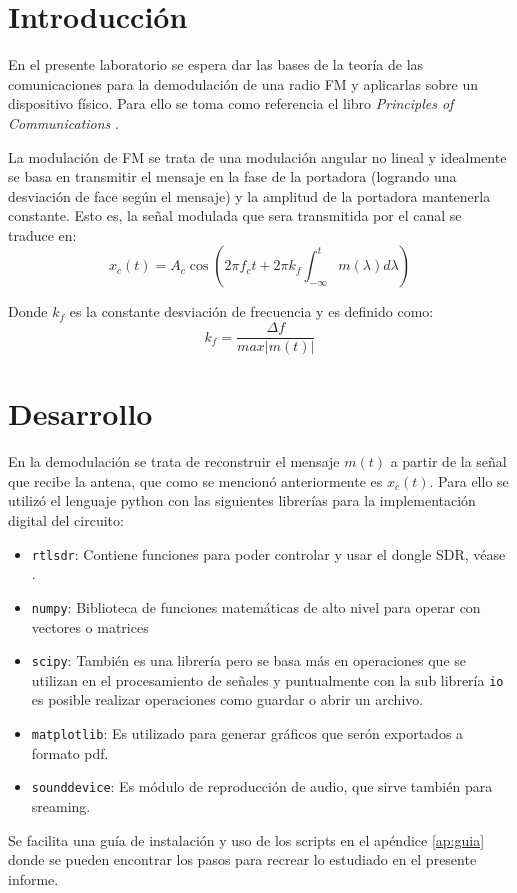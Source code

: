 \section{Introducción}
	En el presente laboratorio se espera dar las bases de la teoría de las comunicaciones para la demodulación de una radio FM y aplicarlas sobre un dispositivo físico.
Para ello se toma como referencia el libro \emph{Principles of Communications} \cite{PrinciplesofCommunications}.

La modulación de FM se trata de una modulación angular no lineal y idealmente se basa en transmitir el mensaje en la fase de la portadora (logrando una desviación de face según el mensaje) y la amplitud de la portadora mantenerla constante. Esto es, la señal modulada que sera transmitida por el canal se traduce en:
$$
	x_c (t) = A_c \cos \left( 2 \pi f_c t + 2 \pi k_f \int_{-\infty}^{t} m(\lambda) d\lambda \right)
$$

Donde $k_f$ es la constante desviación de frecuencia y es definido como:
$$
	k_f = \frac{\Delta f}{max|m(t)|}
$$


\section{Desarrollo}
En la demodulación se trata de reconstruir el mensaje $m(t)$ a partir de la señal que recibe la antena, que como se mencionó anteriormente es $x_c(t)$.
Para ello se utilizó el lenguaje python con las siguientes librerías para la implementación digital del circuito:
\begin{itemize}
	\item \texttt{rtlsdr}: Contiene funciones para poder controlar y usar el dongle SDR, véase \cite{pyrtlsdr}.
	\item \texttt{numpy}: Biblioteca de funciones matemáticas de alto nivel para operar con vectores o matrices
	\item \texttt{scipy}: También es una librería pero se basa más en operaciones que se utilizan en el procesamiento de señales y puntualmente con la sub librería \texttt{io} es posible realizar operaciones como guardar o abrir un archivo. 
	\item \texttt{matplotlib}: Es utilizado para generar gráficos que serón exportados a formato pdf.
	\item \texttt{sounddevice}: Es módulo de reproducción de audio, que sirve también para sreaming.
\end{itemize}

Se facilita una guía de instalación y uso de los scripts en el apéndice \ref{ap:guia} donde se pueden encontrar los pasos para recrear lo estudiado en el presente informe.


